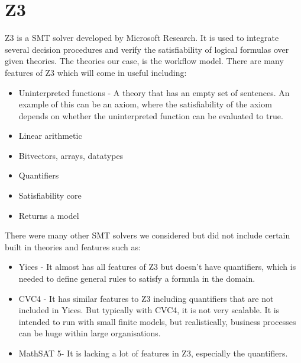 \documentclass[a4paper]{report}
\begin{document}
\section{Z3}
Z3\cite{smt} is a SMT solver developed by Microsoft Research. It is used to integrate several decision procedures and verify the satisfiability of logical formulas over given theories. The theories our case, is the workflow model. There are many features of Z3 which will come in useful including:
\begin{itemize}
\item Uninterpreted functions - A theory that has an empty set of sentences. An example of this can be an axiom, where the satisfiability of the axiom depends on whether the uninterpreted function can be evaluated to true.
\item Linear arithmetic
\item Bitvectors, arrays, datatypes
\item Quantifiers
\item Satisfiability core
\item Returns a model
\end{itemize}

There were many other SMT solvers we considered but did not include certain built in theories and features such as:
\begin{itemize}
\item Yices\cite{yices} - It almost has all features of Z3 but doesn’t have quantifiers, which is needed to define general rules to satisfy a formula in the domain. 
\item CVC4\cite{cvc4} - It has similar features to Z3 including quantifiers that are not included in Yices. But typically with CVC4, it is not very scalable. It is intended to run with small finite models, but realistically, business processes can be huge within large organisations.
\item MathSAT 5\cite{mathsat5}- It is lacking a lot of features in Z3, especially the quantifiers.
\end{itemize}
\end{document}
